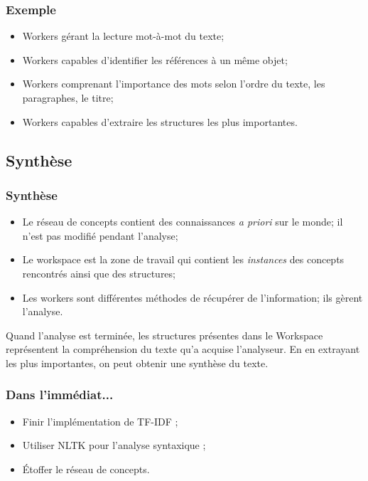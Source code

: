 \documentclass{beamer}
\begin{document}
        \begin{frame}
        \frametitle{Exemple}
            \begin{itemize}
                \item Workers gérant la lecture mot-à-mot du texte;
                \item Workers capables d'identifier les références à un même objet;
                \item Workers comprenant l'importance des mots selon l'ordre du texte, les paragraphes, le titre;
                \item Workers capables d'extraire les structures les plus importantes.
            \end{itemize}
        \end{frame}

    \subsection{Synthèse}
        \begin{frame}
        \frametitle{Synthèse}
            \begin{itemize}
                \item Le réseau de concepts contient des connaissances \textit{a priori} sur le monde; il n'est pas modifié pendant l'analyse;
                \item Le workspace est la zone de travail qui contient les \textit{instances} des concepts rencontrés ainsi que des structures;
                \item Les workers sont différentes méthodes de récupérer de l'information; ils gèrent l'analyse.
            \end{itemize}
            Quand l'analyse est terminée, les structures présentes dans le Workspace représentent la compréhension du texte qu'a acquise l'analyseur.
            En en extrayant les plus importantes, on peut obtenir une synthèse du texte.
        \end{frame}

\begin{frame}
	\frametitle{Dans l'immédiat...}
	\begin{itemize}
		\item Finir l'implémentation de TF-IDF ;
		\item Utiliser NLTK pour l'analyse syntaxique ;
		\item Étoffer le réseau de concepts.
	\end{itemize}
\end{frame}
\end{document}
